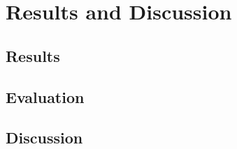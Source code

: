 \chapter{Results and Discussion}\label{chap:results_discussion}
\section{Results}\label{sec:results}
\section{Evaluation}\label{sec:evaluation}
\section{Discussion}\label{sec:discussion}